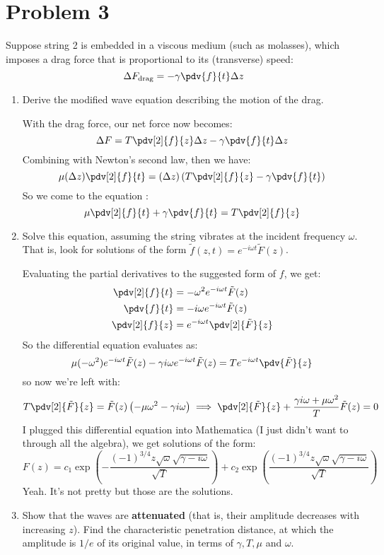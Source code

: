 \documentclass[10pt]{article}
\begin{document}
	\pagebreak
	\section*{Problem 3}
	Suppose string 2 is embedded in a viscous medium (such as molasses), which imposes a drag force that is
	proportional to its (transverse) speed:
	\[
		\Delta F_\text{drag}= -\gamma \pdv{f}{t} \Delta z
	\]
	\begin{enumerate}[label=(\alph*)]
		\item Derive the modified wave equation describing the motion of the drag. 

			\begin{solution}
				With the drag force, our net force now becomes:
				\[
					\Delta F = T \pdv[2]{f}{z} \Delta z - \gamma \pdv{f}{t} \Delta z
				\]
				Combining with Newton's second law, then we have:
				\[
					\mu (\Delta z) \pdv[2]{f}{t} = (\Delta z) \left( T\pdv[2]{f}{z} - \gamma \pdv{f}{t} \right)
				\]
				So we come to the equation :
				\[
					\mu \pdv[2]{f}{t} + \gamma \pdv{f}{t} = T \pdv[2]{f}{z}
				\]
			\end{solution}
		\item Solve this equation, assuming the string vibrates at the incident frequency \( \omega \). That
			is, look for solutions of the form \( \tilde f(z, t) = e^{-i \omega t}\tilde F(z) \).  

			\begin{solution}
				Evaluating the partial derivatives to the suggested form of \( f \), we get:
				\begin{align*}
					\pdv[2]{f}{t} &= -\omega^2 e^{-i \omega t}\tilde F(z)\\
					\pdv{f}{t} &= - i \omega e^{-i \omega t}\tilde F(z) \\ 
					\pdv[2]{f}{z} &= e^{-i \omega t}\pdv[2]{\tilde F}{z} 
				\end{align*}
				So the differential equation evaluates as:
				\[
					\mu (- \omega^2) e^{-i \omega t}\tilde F(z) - \gamma i \omega e^{-i \omega t}\tilde F(z)
					= T e^{-i \omega t}\pdv{\tilde F}{z}
				\]
				so now we're left with:
				\[
					T \pdv[2]{\tilde F}{z} = \tilde F(z) \left( -\mu \omega^2 - \gamma i \omega \right)
					\implies \pdv[2]{\tilde F}{z} + \frac{\gamma i \omega + \mu \omega^2}{T} \tilde F(z) = 0
				\]
				I plugged this differential equation into Mathematica (I just didn't want to through all the
				algebra), we get solutions of the form:
				\[
					F(z) = c_1\exp\left(-\frac{(-1)^{3 / 4}z \sqrt{ \omega} \sqrt{\gamma - i
						\omega}}{\sqrt{T}}\right) + 
					c_2 \exp\left(\frac{(-1)^{3 / 4}z \sqrt{ \omega} \sqrt{\gamma - i
						\omega}}{\sqrt{T}}\right)
				\]
				Yeah. It's not pretty but those are the solutions. 
			\end{solution}
		\item Show that the waves are \textbf{attenuated} (that is, their amplitude decreases with increasing
			\( z \)). Find the characteristic penetration distance, at which the amplitude is \( 1 / e \) of
			its original value, in terms of \( \gamma, T, \mu \) and \( \omega \). 


\end{enumerate}
\end{document}
